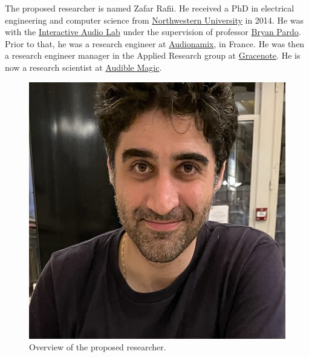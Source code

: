 \documentclass{article}
\begin{document}
\nocite{inbook_pardo_2018}
\nocite{inbook_rafii_2014}

\nocite{report_rafii_2009}

\nocite{misc_mcdermott_oct2012}

\nocite{misc_rafii_jun2014}
\nocite{misc_rafii_jun2011}
\nocite{misc_rafii_dec2007}

\nocite{misc_rafii_mar2021}
\nocite{misc_rafii_apr2018}
\nocite{misc_rafii_july2015}
\nocite{misc_rafii_may2015}
\nocite{misc_rafii_jul2011}

\nocite{misc_rafii_dec2014_4}
\nocite{misc_rafii_dec2014_3}
\nocite{misc_rafii_dec2014_2}
\nocite{misc_rafii_dec2014}

\nocite{online_rafii_2019}
\nocite{online_rafii_2017}


The proposed researcher is named Zafar Rafii. He received a PhD in electrical engineering and computer science from \href{https://www.northwestern.edu/}{Northwestern University} in 2014. He was with the \href{https://interactiveaudiolab.github.io/}{Interactive Audio Lab} under the supervision of professor \href{https://bryan-pardo.github.io/}{Bryan Pardo}. Prior to that, he was a research engineer at \href{https://audionamix.com/}{Audionamix}, in France. He was then a research engineer manager in the Applied Research group at \href{https://www.gracenote.com/}{Gracenote}. He is now a research scientist at \href{https://www.audiblemagic.com/}{Audible Magic}.

\begin{figure}[!htb]
\centering
\includegraphics[width=0.5\columnwidth]{Images/zafar.jpg}
\caption{Overview of the proposed researcher.}
\label{fig:zafar}
\end{figure}
\end{document}
